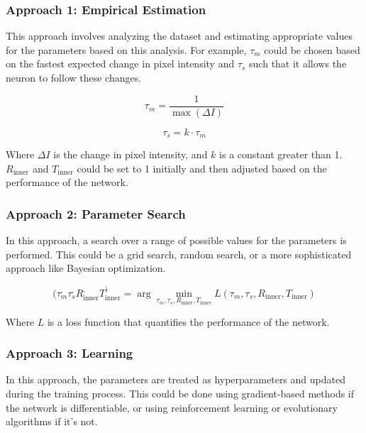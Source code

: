\subsubsection{Approach 1: Empirical Estimation}

This approach involves analyzing the dataset and estimating appropriate values for the parameters based on this analysis. For example, $\tau_m$ could be chosen based on the fastest expected change in pixel intensity and $\tau_s$ such that it allows the neuron to follow these changes.

\begin{equation}
\tau_m = \frac{1}{\max(\Delta I)}
\end{equation}

\begin{equation}
\tau_s = k\cdot\tau_m
\end{equation}

Where $\Delta I$ is the change in pixel intensity, and $k$ is a constant greater than 1. $R_{\text{inner}}$ and $T_{\text{inner}}$ could be set to 1 initially and then adjusted based on the performance of the network.

\subsubsection{Approach 2: Parameter Search}

In this approach, a search over a range of possible values for the parameters is performed. This could be a grid search, random search, or a more sophisticated approach like Bayesian optimization.

\begin{equation}
(\tau_m^, \tau_s^, R_{\text{inner}}^, T_{\text{inner}}^) = \arg\min_{\tau_m, \tau_s, R_{\text{inner}}, T_{\text{inner}}} L(\tau_m, \tau_s, R_{\text{inner}}, T_{\text{inner}})
\end{equation}

Where $L$ is a loss function that quantifies the performance of the network.

\subsubsection{Approach 3: Learning}

In this approach, the parameters are treated as hyperparameters and updated during the training process. This could be done using gradient-based methods if the network is differentiable, or using reinforcement learning or evolutionary algorithms if it's not.

